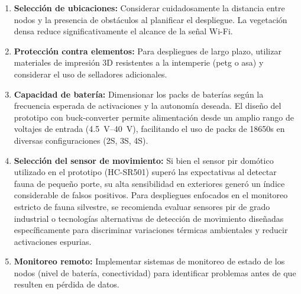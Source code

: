 \documentclass[a4paper, 12pt]{report}
\begin{document}
\begin{enumerate}
  \item \textbf{Selección de ubicaciones:} Considerar cuidadosamente la
    distancia entre nodos y la presencia de obstáculos al planificar
    el despliegue. La vegetación densa reduce significativamente el
    alcance de la señal Wi-Fi.

  \item \textbf{Protección contra elementos:} Para despliegues de largo
    plazo, utilizar materiales de impresión 3D resistentes a la
    intemperie (\gls{petg} o \gls{asa}) y considerar el uso de
    selladores adicionales.

  \item \textbf{Capacidad de batería:} Dimensionar los packs de baterías
    según la frecuencia esperada de activaciones y la autonomía deseada.
    El diseño del prototipo con \gls{buck-converter} permite alimentación
    desde un amplio rango de voltajes de entrada (\qtyrange{4.5}{40}{V}), facilitando
    el uso de packs de \glspl{18650} en diversas configuraciones
    (2S, 3S, 4S).

  \item \textbf{Selección del sensor de movimiento:} Si bien el sensor \gls{pir}
    domótico utilizado en el prototipo (HC-SR501) superó las expectativas
    al detectar fauna de pequeño porte, su alta sensibilidad en exteriores
    generó un índice considerable de falsos positivos. Para despliegues
    enfocados en el monitoreo estricto de fauna silvestre, se recomienda evaluar
    sensores \gls{pir} de grado industrial o tecnologías alternativas de
    detección de movimiento diseñadas específicamente para discriminar
    variaciones térmicas ambientales y reducir activaciones espurias.

  \item \textbf{Monitoreo remoto:} Implementar sistemas de monitoreo de
    estado de los nodos (nivel de batería, conectividad) para
    identificar problemas antes de que resulten en pérdida de datos.
\end{enumerate}

\printbibliography[heading=bibnumbered]

\appendix
\end{document}
